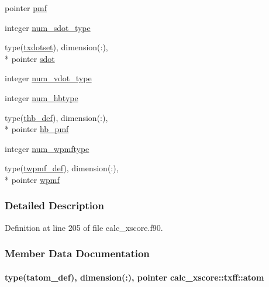 \begin{DoxyCompactItemize}
pointer \hyperlink{structcalc__xscore_1_1txff_adb8eb69a3fabc7f79348583f9e7d6274}{pmf}
\item 
integer \hyperlink{structcalc__xscore_1_1txff_a41240d5ca2023910ac16f56e627852f9}{num\-\_\-sdot\-\_\-type}
\item 
type(\hyperlink{structcalc__xscore_1_1txdotset}{txdotset}), dimension(\-:), \\*
pointer \hyperlink{structcalc__xscore_1_1txff_a271957277a08222d4018553c38a5423a}{sdot}
\item 
integer \hyperlink{structcalc__xscore_1_1txff_a67b1c13d5b53f888833ccf5de6309774}{num\-\_\-vdot\-\_\-type}
\item 
integer \hyperlink{structcalc__xscore_1_1txff_a16480893953bb1659c433fbeb70a4167}{num\-\_\-hbtype}
\item 
type(\hyperlink{structcalc__xscore_1_1thb__def}{thb\-\_\-def}), dimension(\-:), \\*
pointer \hyperlink{structcalc__xscore_1_1txff_ac9365f9c3dc44037f16ed93129351c40}{hb\-\_\-pmf}
\item 
integer \hyperlink{structcalc__xscore_1_1txff_a6eb1f6d07808cad107807db8fd38a734}{num\-\_\-wpmftype}
\item 
type(\hyperlink{structcalc__xscore_1_1twpmf__def}{twpmf\-\_\-def}), dimension(\-:), \\*
pointer \hyperlink{structcalc__xscore_1_1txff_ae90abf3cd88ed2be733ce7f0223df2e0}{wpmf}
\end{DoxyCompactItemize}


\subsubsection{Detailed Description}


Definition at line 205 of file calc\-\_\-xscore.\-f90.



\subsubsection{Member Data Documentation}
\hypertarget{structcalc__xscore_1_1txff_a2c4aa78c3a40e0da8a5ee4189872ad80}{
\paragraph[{atom}]{\setlength{\rightskip}{0pt plus 5cm}type({\bf tatom\-\_\-def}), dimension(\-:), pointer calc\-\_\-xscore\-::txff\-::atom}}\label{structcalc__xscore_1_1txff_a2c4aa78c3a40e0da8a5ee4189872ad80}


